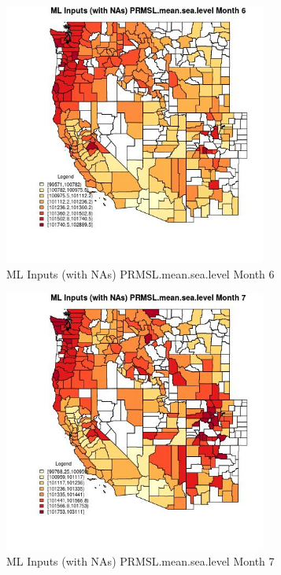 \begin{figure} 
\centering  
\includegraphics[width=0.77\textwidth]{Code_Outputs/Report_ML_input_PM25_Step4_part_f_de_duplicated_aves_prioritize_24hr_obswNAs_CountyPRMSLmeansealevelmedianMonth6.jpg} 
\caption{\label{fig:Report_ML_input_PM25_Step4_part_f_de_duplicated_aves_prioritize_24hr_obswNAsCountyPRMSLmeansealevelmedianMonth6}ML Inputs (with NAs) PRMSL.mean.sea.level Month 6} 
\end{figure} 
 

\begin{figure} 
\centering  
\includegraphics[width=0.77\textwidth]{Code_Outputs/Report_ML_input_PM25_Step4_part_f_de_duplicated_aves_prioritize_24hr_obswNAs_CountyPRMSLmeansealevelmedianMonth7.jpg} 
\caption{\label{fig:Report_ML_input_PM25_Step4_part_f_de_duplicated_aves_prioritize_24hr_obswNAsCountyPRMSLmeansealevelmedianMonth7}ML Inputs (with NAs) PRMSL.mean.sea.level Month 7} 
\end{figure} 
 

